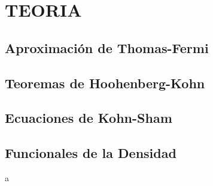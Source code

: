 \chapter{TEORIA}

% 


 



\section{Aproximación de Thomas-Fermi}

\section{Teoremas de Hoohenberg-Kohn}   

\section{Ecuaciones de Kohn-Sham}

\section{Funcionales de la Densidad}

a